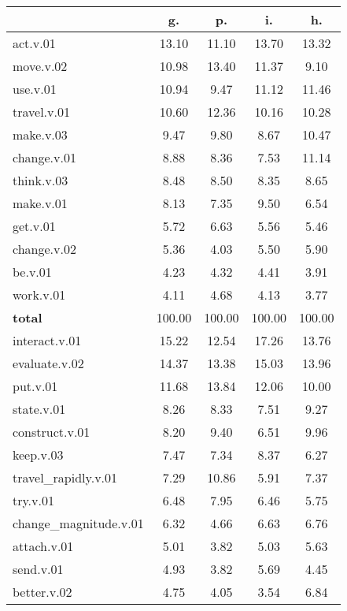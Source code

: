 \begin{table}[h!]
\begin{center}
\begin{tabular}{| l || c | c | c | c |}\hline
 & {\bf g.} & {\bf p.} & {\bf i.} & {\bf h.} \\\hline\hline
act.v.01 & 13.10  & 11.10  & 13.70  & 13.32 \\\hline
move.v.02 & 10.98  & 13.40  & 11.37  & 9.10 \\\hline
use.v.01 & 10.94  & 9.47  & 11.12  & 11.46 \\\hline
travel.v.01 & 10.60  & 12.36  & 10.16  & 10.28 \\\hline
make.v.03 & 9.47  & 9.80  & 8.67  & 10.47 \\\hline
change.v.01 & 8.88  & 8.36  & 7.53  & 11.14 \\\hline
think.v.03 & 8.48  & 8.50  & 8.35  & 8.65 \\\hline
make.v.01 & 8.13  & 7.35  & 9.50  & 6.54 \\\hline
get.v.01 & 5.72  & 6.63  & 5.56  & 5.46 \\\hline
change.v.02 & 5.36  & 4.03  & 5.50  & 5.90 \\\hline
be.v.01 & 4.23  & 4.32  & 4.41  & 3.91 \\\hline
work.v.01 & 4.11  & 4.68  & 4.13  & 3.77 \\\hline\hline
{{\bf total}} & 100.00  & 100.00  & 100.00  & 100.00 \\\hline\hline\hline
interact.v.01 & 15.22  & 12.54  & 17.26  & 13.76 \\\hline
evaluate.v.02 & 14.37  & 13.38  & 15.03  & 13.96 \\\hline
put.v.01 & 11.68  & 13.84  & 12.06  & 10.00 \\\hline
state.v.01 & 8.26  & 8.33  & 7.51  & 9.27 \\\hline
construct.v.01 & 8.20  & 9.40  & 6.51  & 9.96 \\\hline
keep.v.03 & 7.47  & 7.34  & 8.37  & 6.27 \\\hline
travel\_rapidly.v.01 & 7.29  & 10.86  & 5.91  & 7.37 \\\hline
try.v.01 & 6.48  & 7.95  & 6.46  & 5.75 \\\hline
change\_magnitude.v.01 & 6.32  & 4.66  & 6.63  & 6.76 \\\hline
attach.v.01 & 5.01  & 3.82  & 5.03  & 5.63 \\\hline
send.v.01 & 4.93  & 3.82  & 5.69  & 4.45 \\\hline
better.v.02 & 4.75  & 4.05  & 3.54  & 6.84 \\\hline\hline

\end{tabular}
\end{center}
\end{table}
